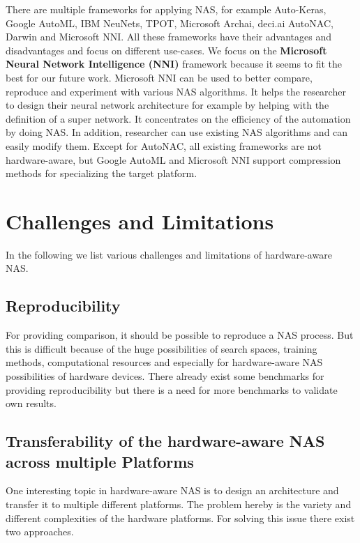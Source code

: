 \documentclass[conference]{IEEEtran}
\begin{document}
There are multiple frameworks for applying NAS, for example Auto-Keras, Google AutoML, IBM NeuNets, TPOT, Microsoft Archai, deci.ai AutoNAC, Darwin and Microsoft NNI. All these frameworks have their advantages and disadvantages and focus on different use-cases. We focus on the \textbf{Microsoft Neural Network Intelligence (NNI)} framework because it seems to fit the best for our future work. Microsoft NNI can be used to better compare, reproduce and experiment with various NAS algorithms. It helps the researcher to design their neural network architecture for example by helping with the definition of a super network. It concentrates on the efficiency of the automation by doing NAS. In addition, researcher can use existing NAS algorithms and can easily modify them. Except for AutoNAC, all existing frameworks are not hardware-aware, but Google AutoML and Microsoft NNI support compression methods for specializing the target platform. 

\section{Challenges and Limitations}
\label{section:Challenges}

In the following we list various challenges and limitations of hardware-aware NAS. 

\subsection{Reproducibility}

For providing comparison, it should be possible to reproduce a NAS process. But this is difficult because of the huge possibilities of search spaces, training methods, computational resources and especially for hardware-aware NAS possibilities of hardware devices. There already exist some benchmarks for providing reproducibility but there is a need for more benchmarks to validate own results.
 
\subsection{Transferability of the hardware-aware NAS across multiple Platforms}

One interesting topic in hardware-aware NAS is to design an architecture and transfer it to multiple different platforms. The problem hereby is the variety and different complexities of the hardware platforms. For solving this issue there exist two approaches.
\end{document}
